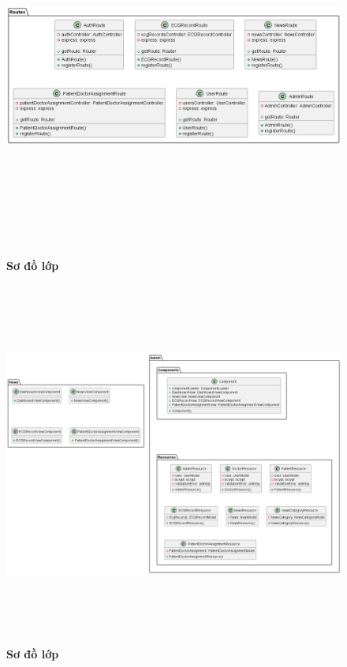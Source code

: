 \documentclass{article}%
\begin{document}
\begin{enumerate}[a)]
\begin{figure}[H]
  \centering
  \includegraphics[width=15cm,height=12cm]{Images/server/class/class_route.png}
  \caption[Sơ đồ lớp]{\bfseries \fontsize{12pt}{0pt}\selectfont Sơ đồ lớp}
  \label{hinh2} %
\end{figure}


\begin{figure}[H]
  \centering
  \includegraphics[width=15cm,height=12cm]{Images/server/class/class_admin.png}
  \caption[Sơ đồ lớp]{\bfseries \fontsize{12pt}{0pt}\selectfont Sơ đồ lớp}
  \label{hinh2} %
\end{figure}



\end{enumerate}
\end{document}
